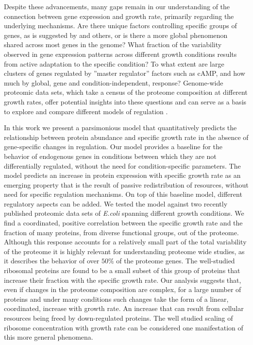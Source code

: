 \documentclass{article}
\begin{document}
Despite these advancements, many gaps remain in our understanding of the connection between gene expression and growth rate, primarily regarding the underlying mechanisms.
Are there unique factors controlling specific groups of genes, as is suggested by \cite{You_2013,Peebo_2015,Hui_2015,Bosdriesz_2015} and others, or is there a more global phenomenon shared across most genes in the genome?
What fraction of the variability observed in gene expression patterns across different growth conditions results from active adaptation to the specific condition?
To what extent are large clusters of genes regulated by ''master regulator'' factors such as cAMP, and how much by global, gene and condition-independent, response?
Genome-wide proteomic data sets, which take a census of the proteome composition at different growth rates, offer potential insights into these questions and can serve as a basis to explore and compare different models of regulation \cite{Valgepea2013,Heinemann2015,Hui_2015,Peebo_2015}.

In this work we present a parsimonious model that quantitatively predicts the relationship between protein abundance and specific growth rate in the absence of gene-specific changes in regulation.
Our model provides a baseline for the behavior of endogenous genes in conditions between which they are not differentially regulated, without the need for condition-specific parameters.
The model predicts an increase in protein expression with specific growth rate as an emerging property that is the result of passive redistribution of resources, without need for specific regulation mechanisms.
On top of this baseline model, different regulatory aspects can be added.
We tested the model against two recently published proteomic data sets of \emph{E.coli} spanning different growth conditions\cite{Peebo_2015,Heinemann2015}.
We find a coordinated, positive correlation between the specific growth rate and the fraction of many proteins, from diverse functional groups, out of the proteome.
Although this response accounts for a relatively small part of the total variability of the proteome it is highly relevant for understanding proteome wide studies, as it describes the behavior of over $50\%$ of the proteome genes.
The well-studied ribosomal proteins are found to be a small subset of this group of proteins that increase their fraction with the specific growth rate.
Our analysis suggests that, even if changes in the proteome composition are complex, for a large number of proteins and under many conditions such changes take the form of a linear, coordinated, increase with growth rate.
An increase that can result from cellular resources being freed by down-regulated proteins.
The well studied scaling of ribosome concentration with growth rate can be considered one manifestation of this more general phenomena.
\end{document}
